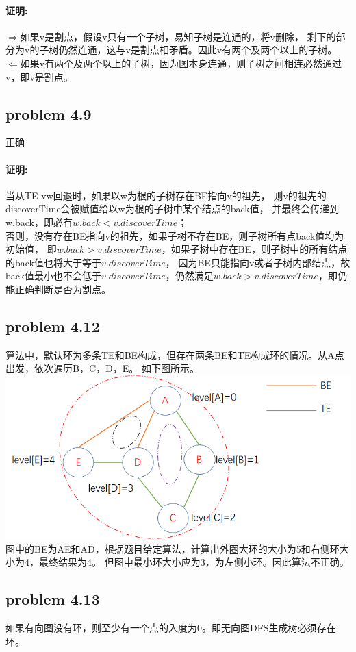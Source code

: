 \documentclass[11pt,a4paper,oneside,oldfontcommands]{ctexart}
\begin{document}
\paragraph{证明:}
\textbf{$\Rightarrow$}如果v是割点，假设v只有一个子树，易知子树是连通的，将v删除，
剩下的部分为v的子树仍然连通，这与v是割点相矛盾。因此v有两个及两个以上的子树。\\
\textbf{$\Leftarrow$}如果v有两个及两个以上的子树，因为图本身连通，则子树之间相连必然通过v，即v是割点。
{\subsection*{problem 4.9}}
正确
\paragraph{证明:}
当从TE vw回退时，如果以w为根的子树存在BE指向v的祖先，
则v的祖先的discoverTime会被赋值给以w为根的子树中某个结点的back值，
并最终会传递到w.back，即必有$w.back<v.discoverTime$；\\
\hspace*{20pt}否则，没有存在BE指向v的祖先，如果子树不存在BE，则子树所有点back值均为初始值，
即$w.back>v.discoverTime$，如果子树中存在BE，则子树中的所有结点的back值也将大于等于$v.discoverTime$，
因为BE只能指向v或者子树内部结点，故back值最小也不会低于$v.discoverTime$，仍然满足$w.back>v.discoverTime$，即仍能正确判断是否为割点。
{\subsection*{problem 4.12}}
算法中，默认环为多条TE和BE构成，但存在两条BE和TE构成环的情况。从A点出发，依次遍历B，C，D，E。
如下图所示。\\
\includegraphics{4-12.png}\\
图中的BE为AE和AD，根据题目给定算法，计算出外圈大环的大小为5和右侧环大小为4，最终结果为4。
但图中最小环大小应为3，为左侧小环。因此算法不正确。
{\subsection*{problem 4.13}}
如果有向图没有环，则至少有一个点的入度为0。即无向图DFS生成树必须存在环。
\end{document}
